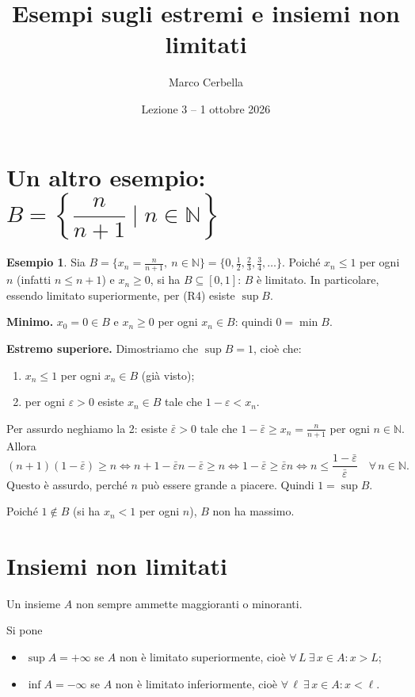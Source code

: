 \documentclass[11pt,a4paper]{article}
\title{Esempi sugli estremi e insiemi non limitati}
\author{Marco Cerbella}
\date{Lezione 3 -- 1 ottobre 2026}
\theoremstyle{definition}
\newtheorem*{esempio}{Esempio}
\begin{document}
\maketitle

\section{Un altro esempio: $B = \left\{ \dfrac{n}{n+1} \mid n \in \mathbb{N} \right\}$}

\begin{esempio}
Sia $B = \{x_n = \frac{n}{n+1},\ n \in \mathbb{N}\} = \{0, \frac12, \frac23, \frac34, \dots\}$. Poiché $x_n \leq 1$ per ogni $n$ (infatti $n \leq n + 1$) e $x_n \geq 0$, si ha $B \subseteq [0, 1]$: $B$ è limitato. In particolare, essendo limitato superiormente, per (R4) esiste $\sup B$.

\textbf{Minimo.} $x_0 = 0 \in B$ e $x_n \geq 0$ per ogni $x_n \in B$: quindi $0 = \min B$.

\textbf{Estremo superiore.} Dimostriamo che $\sup B = 1$, cioè che:
\begin{enumerate}
    \item $x_n \leq 1$ per ogni $x_n \in B$ (già visto);
    \item per ogni $\varepsilon > 0$ esiste $x_n \in B$ tale che $1 - \varepsilon < x_n$.
\end{enumerate}
Per assurdo neghiamo la 2: esiste $\bar\varepsilon > 0$ tale che $1 - \bar\varepsilon \geq x_n = \frac{n}{n+1}$ per ogni $n \in \mathbb{N}$. Allora
\[
(n+1)(1 - \bar\varepsilon) \geq n \iff n + 1 - \bar\varepsilon n - \bar\varepsilon \geq n
\iff 1 - \bar\varepsilon \geq \bar\varepsilon n
\iff n \leq \frac{1 - \bar\varepsilon}{\bar\varepsilon} \quad \forall\, n \in \mathbb{N}.
\]
Questo è assurdo, perché $n$ può essere grande a piacere. Quindi $1 = \sup B$.

Poiché $1 \notin B$ (si ha $x_n < 1$ per ogni $n$), $B$ non ha massimo.
\end{esempio}

\section{Insiemi non limitati}

Un insieme $A$ non sempre ammette maggioranti o minoranti.

\begin{definizione}
Si pone
\begin{itemize}
    \item $\sup A = +\infty$ se $A$ non è limitato superiormente, cioè
          $\forall\, L \ \exists\, x \in A : x > L$;
    \item $\inf A = -\infty$ se $A$ non è limitato inferiormente, cioè
          $\forall\, \ell \ \exists\, x \in A : x < \ell$.
\end{itemize}
\end{definizione}
\end{document}
